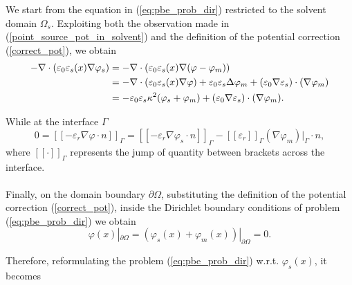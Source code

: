 \documentclass[11pt,a4paper]{article}
\begin{document}
We start from the equation in (\ref{eq:pbe_prob_dir}) restricted to the solvent domain $\Omega_s$. Exploiting both the observation made in (\ref{point_source_pot_in_solvent}) and the definition of the potential correction (\ref{correct_pot}), we obtain
\begin{equation*}
\centering
\begin{aligned}
        - \nabla \cdot (\varepsilon_0 \varepsilon_s (x) \nabla \varphi_s ) & = - \nabla \cdot (\varepsilon_0 \varepsilon_s (x) \nabla (\varphi - \varphi_m) ) \\
        & = - \nabla \cdot (\varepsilon_0 \varepsilon_s (x) \nabla \varphi) + \varepsilon_0 \varepsilon_s \Delta \varphi_m + (\varepsilon_0 \nabla \varepsilon_s ) \cdot (\nabla \varphi_m) \\
        & = - \varepsilon_0 \varepsilon_s \kappa^2 (\varphi_s + \varphi_m) + (\varepsilon_0 \nabla \varepsilon_s ) \cdot (\nabla \varphi_m).
\end{aligned}
\end{equation*}

While at the interface $\Gamma$
\begin{equation*}
    0 = [[-\varepsilon_r \nabla \varphi \cdot n]]_{\Gamma} =  [[- \varepsilon_r \nabla \varphi_s \cdot n]]_{\Gamma} - [[ \varepsilon_r]]_{\Gamma} (\nabla \varphi_m)|_{\Gamma} \cdot n,
\end{equation*} 
where $[[\cdot]]_{\Gamma}$ represents the jump of quantity between brackets across the interface. \\\\
Finally, on the domain boundary $\partial \Omega$, substituting the definition of the potential correction (\ref{correct_pot}), inside the Dirichlet boundary conditions of problem (\ref{eq:pbe_prob_dir}) we obtain
\begin{equation*}
    \varphi(x)|_{\partial\Omega} = (\varphi_s (x) + \varphi_m (x))|_{\partial\Omega} = 0.
\end{equation*}

Therefore, reformulating the problem  (\ref{eq:pbe_prob_dir}) w.r.t. $\varphi_s (x)$, it becomes
\end{document}
